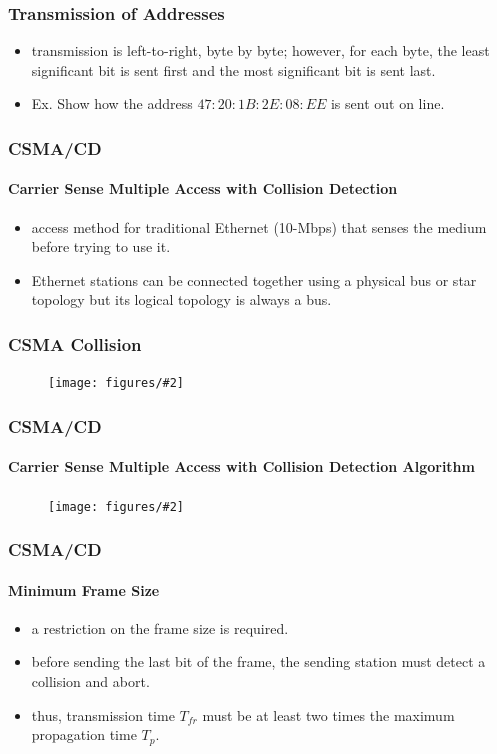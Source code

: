 \documentclass{beamer}
\newcommand{\fig}[2]{
\begin{center}
\begin{figure}
\texttt{[image: figures/\#2]}
\end{figure}
\end{center}
}
\begin{document}
 
\begin{frame}
\frametitle{\huge Transmission of Addresses} 
\begin{itemize} 
\Large
\item <1-> transmission is left-to-right, byte by byte; however, for each byte, the least significant bit is sent first and the most significant bit is sent last.
\item <2-> Ex. Show how the address $47:20:1B:2E:08:EE$ is sent out on line.
\end{itemize}
\uncover<3->{
\fig{0.6}{network_addtrans}
}
\end{frame} 



\begin{frame}
\frametitle{CSMA/CD} 
\framesubtitle{Carrier Sense Multiple Access with Collision Detection}
\begin{itemize} 
\Large
\item <1-> access method for traditional Ethernet (10-Mbps) that  senses the medium before trying to use it.
\item <2-> Ethernet stations can be connected together using a physical bus or star topology but its logical topology is always a bus.
\end{itemize}
\end{frame} 


\begin{frame}
\frametitle{\huge CSMA Collision} 
\fig{0.6}{network_csma}
\end{frame} 


\begin{frame}
\frametitle{CSMA/CD} 
\framesubtitle{Carrier Sense Multiple Access with Collision Detection Algorithm}
\fig{0.55}{network_csmacd}
\end{frame} 


\begin{frame}
\frametitle{CSMA/CD} 
\framesubtitle{Minimum Frame Size}
 \begin{itemize} 
\Large
\item <1-> a restriction on the frame size is required.
\item <2-> before sending the last bit of the frame, the sending station must detect a collision and abort.
\item <3-> thus, transmission time $T_{fr}$ must be at least two times the maximum propagation time $T_p$.
\end{itemize}
\end{frame}
\end{document}
